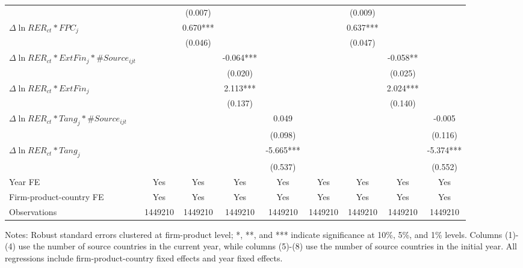 \documentclass[12pt]{article}
\begin{document}
\begin{table}
{\begin{threeparttable}
\begin{tabular}{lcccccccc}
			&   & (0.007) &       &       &       & (0.009) &       &  \\
			$\Delta \ln RER_{ct}*FPC_{j}$ &  & 0.670*** &       &       &       & 0.637*** &       &  \\
			&   & (0.046) &       &       &       & (0.047) &       &  \\
			$\Delta \ln RER_{ct}*ExtFin_{j}*\#Source_{ijt}$ &   &       & -0.064*** &       &       &       & -0.058** &  \\
			&   &       & (0.020) &       &       &       & (0.025) &  \\
			$\Delta \ln RER_{ct}*ExtFin_{j}$ &     &       & 2.113*** &       &       &       & 2.024*** &  \\
			&   &       & (0.137) &       &       &       & (0.140) &  \\
			$\Delta \ln RER_{ct}*Tang_{j}*\#Source_{ijt}$ &    &       &       & 0.049 &       &       &       & -0.005 \\
			&    &       &       & (0.098) &       &       &       & (0.116) \\
			$\Delta \ln RER_{ct}*Tang_{j}$ &   &       &       & -5.665*** &       &       &       & -5.374*** \\
			&  &       &       & (0.537) &       &       &       & (0.552) \\
			Year FE  & Yes   & Yes   & Yes   & Yes & Yes   & Yes   & Yes   & Yes\\
			Firm-product-country FE & Yes   & Yes   & Yes   & Yes & Yes   & Yes   & Yes   & Yes\\
			Observations & 1449210 & 1449210 & 1449210 & 1449210 & 1449210 & 1449210 & 1449210 & 1449210\\
			\bottomrule
		\end{tabular}
		\begin{tablenotes}
			\footnotesize
			\item[Notes:] Robust standard errors clustered at firm-product level; *, **, and *** indicate significance at 10\%, 5\%, and 1\% levels. Columns (1)-(4) use the number of source countries in the current year, while columns (5)-(8) use the number of source countries in the initial year. All regressions include firm-product-country fixed effects and year fixed effects.
		\end{tablenotes}
	\end{threeparttable}
	}
	\label{tab.source}
\end{table}
\end{document}
